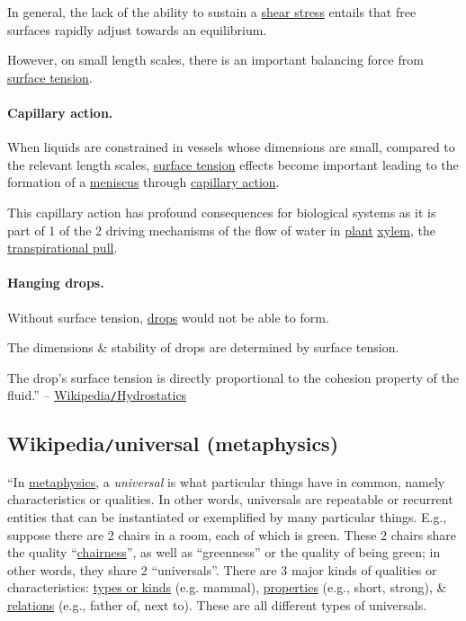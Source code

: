 \documentclass{article}
\begin{document}
In general, the lack of the ability to sustain a \href{https://en.wikipedia.org/wiki/Shear_stress}{shear stress} entails that free surfaces rapidly adjust towards an equilibrium.

However, on small length scales, there is an important balancing force from \href{https://en.wikipedia.org/wiki/Surface_tension}{surface tension}.

\paragraph{Capillary action.} When liquids are constrained in vessels whose dimensions are small, compared to the relevant length scales, \href{https://en.wikipedia.org/wiki/Surface_tension}{surface tension} effects become important leading to the formation of a \href{https://en.wikipedia.org/wiki/Meniscus_(liquid)}{meniscus} through \href{https://en.wikipedia.org/wiki/Capillary_action}{capillary action}.

This capillary action has profound consequences for biological systems as it is part of 1 of the 2 driving mechanisms of the flow of water in \href{https://en.wikipedia.org/wiki/Plant}{plant} \href{https://en.wikipedia.org/wiki/Xylem}{xylem}, the \href{https://en.wikipedia.org/wiki/Transpirational_pull}{transpirational pull}.

\paragraph{Hanging drops.} Without surface tension, \href{https://en.wikipedia.org/wiki/Drop_(liquid)}{drops} would not be able to form.

The dimensions \& stability of drops are determined by surface tension.

The drop's surface tension is directly proportional to the cohesion property of the fluid.'' -- \href{https://en.wikipedia.org/wiki/Hydrostatics}{Wikipedia{\tt/}Hydrostatics}


\subsection{Wikipedia{\tt/}universal (metaphysics)}
``In \href{https://en.wikipedia.org/wiki/Metaphysics}{metaphysics}, a {\it universal} is what particular things have in common, namely characteristics or qualities. In other words, universals are repeatable or recurrent entities that can be instantiated or exemplified by many particular things. E.g., suppose there are 2 chairs in a room, each of which is green. These 2 chairs share the quality ``\href{https://en.wiktionary.org/wiki/chairness}{chairness}'', as well as ``greenness'' or the quality of being green; in other words, they share 2 ``universals''. There are 3 major kinds of qualities or characteristics: \href{https://en.wikipedia.org/wiki/Type_(metaphysics)}{types or kinds} (e.g. mammal), \href{https://en.wikipedia.org/wiki/Property_(metaphysics)}{properties} (e.g., short, strong), \& \href{https://en.wikipedia.org/wiki/Relation_(metaphysics)}{relations} (e.g., father of, next to). These are all different types of universals.
\end{document}
